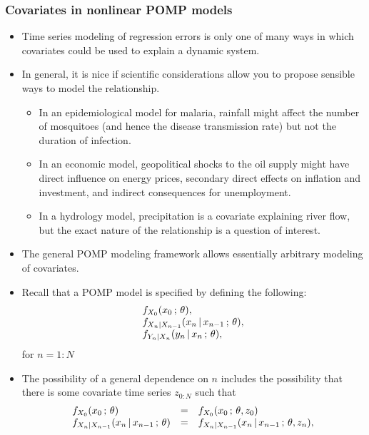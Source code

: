 \documentclass[]{article}
\begin{document}
\subsubsection{Covariates in nonlinear POMP
models}\label{covariates-in-nonlinear-pomp-models}

\begin{itemize}
\item
  Time series modeling of regression errors is only one of many ways in
  which covariates could be used to explain a dynamic system.
\item
  In general, it is nice if scientific considerations allow you to
  propose sensible ways to model the relationship.

  \begin{itemize}
  \item
    In an epidemiological model for malaria, rainfall might affect the
    number of mosquitoes (and hence the disease transmission rate) but
    not the duration of infection.
  \item
    In an economic model, geopolitical shocks to the oil supply might
    have direct influence on energy prices, secondary direct effects on
    inflation and investment, and indirect consequences for
    unemployment.
  \item
    In a hydrology model, precipitation is a covariate explaining river
    flow, but the exact nature of the relationship is a question of
    interest.
  \end{itemize}
\item
  The general POMP modeling framework allows essentially arbitrary
  modeling of covariates.
\item
  Recall that a POMP model is specified by defining the following:
  \[\begin{array}{l}
  f_{X_{0}}(x_0\, ; \,\theta),
  \\
  f_{X_{n}|X_{n-1}}(x_{n}{\, | \,} x_{n-1}\, ; \,\theta),
  \\
  f_{Y_{n}|X_n}(y_{n}{\, | \,} x_n\, ; \,\theta),
  \end{array}\] for \(n=1:N\)
\item
  The possibility of a general dependence on \(n\) includes the
  possibility that there is some covariate time series \(z_{0:N}\) such
  that \[\begin{array}{lcl}
  f_{X_{0}}(x_0\, ; \,\theta)&=& f_{X_{0}}(x_0\, ; \,\theta,z_0)
  \\
  f_{X_{n}|X_{n-1}}(x_{n}{\, | \,} x_{n-1}\, ; \,\theta) &=& f_{X_{n}|X_{n-1}}(x_{n}{\, | \,} x_{n-1}\, ; \,\theta,z_n),

\end{array}\]
\end{itemize}
\end{document}
